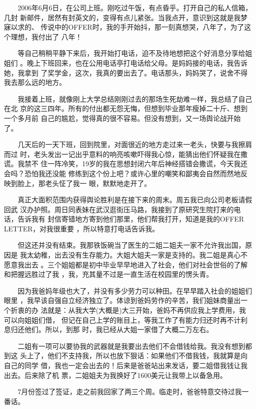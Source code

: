 \documentclass[12pt]{book}
\begin{document}
　　2006年6月6日，在公司上班。刚吃过午饭，有点昏乎。打开自己的私人信箱，几封
新邮件，居然有封英文的，变得有点儿紧张。当我点开，意识到这就是我梦寐以求的、
传说中的OFFER时，我的手开始抖，那一刻真想哭，八年了，为了这个理想，我付出了
八年！

　　等自己稍稍平静下来后，我开始打电话，迫不及待地想把这个好消息分享给姐姐们
。晚上下班回来，也在公用电话亭打电话给父母。是妈妈接的电话，我告诉她，我拿到
了奖学金，这次，我真的要出去了。电话那头，妈妈哭了，说舍不得我去那么远的地方。

　　我接着上班，就像刚上大学总结刚刚过去的那场生死劫难一样，我总结了自己在北
京的这三四年。所有的付出都无怨无悔，但想到毕业那年瘦掉二十斤、想到一个多月前
自己的尴尬，觉得真的很不容易。但没有想到，又一场舆论战开始了。

　　几天后的一天下班，回到院里，对面很近的地方走过来一老头，快要与我擦肩而过
时，老头发出一记出乎意料的响亮咳嗽吓得我心惊，能猜出他们怀疑我在撒谎。我禁不
住一阵冷笑，19岁的我在思想封闭六年后神经搭错会撒谎，今天我还会吗？恐怕我还没能
修练到这个份上吧？或许心里的嘲笑和鄙夷会自然而然地反映到脸上，那老头怔了我一
眼，默默地走开了。

　　真正大面积范围内获得舆论胜利是在接下来的周末。周五我已向公司老板请假回武
汉办护照。周日同表妹在武汉逛街压马路，我接到了原研究生院打来的电话，告诉我有
封信寄错地方寄到他们那里，他们帮我打开，知道是我的OFFER　LETTER，对我很重要
，所以特意打电话告诉我。

　　但这还并没有结束。我那铁饭碗当了医生的二姐二姐夫一家不允许我出国，原因是
我太幼稚，出去没有生存能力。大姐大姐夫一家是支持的。我二姐是真心不愿意我出去
。三个姐姐都是初中毕业早早地进入了社会，他们对社会世俗的了解和把握远胜过了我
，我，充其量不过是一直生活在校园里的愣头青。

　　因为我爸妈年级也大了，并没有多少劳力可以种田。在早早踏入社会的姐姐们眼里
，我早该自强自立经济独立了。体谅到爸妈劳作的辛苦，我们姐妹商量出一个折衷的办
法就是：从我大学(大概是)大三开始，爸妈不再供应我上学费用，我可以向姐姐们借，
但记在自己上学的账目上，等我工作了有能力归还时再不计利息归还他们。所以，到那
时，我已经从大姐一家借了大概二万左右。

　　二姐有一项可以要协我的武器就是我要出去他们不会借钱给我。我没有想到都到这
头上了，他们不支持我，所以也放下狠话：如果他们不借我钱，我就算是向自己的同学
借，我也一定会出去的！后来是爸爸站出来发话，要二姐借我钱让我出去。后来除了机
票，二姐姐夫为我换好了1600美元让我带上以备急用。

　　7月份签过了签证，走之前我回家了两三个周。临走时，爸爸特意交待过我一番话。
\end{document}
